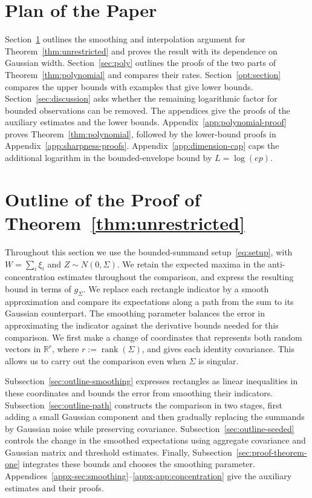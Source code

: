 \documentclass[11pt,letterpaper]{article}
\newenvironment{recovered}{}{}
\newcommand{\vSix}[1]{{\color{magenta}#1}}
\theoremstyle{remark}
\newcommand{\R}{\mathbb R}
\begin{document}
\section*{Plan of the Paper}
Section~\ref{sec:smoothing} outlines the smoothing and interpolation
\vSix{argument for Theorem~\ref{thm:unrestricted} and proves the result
with its dependence on Gaussian width.}
{Section~\ref{sec:poly} outlines the proofs of the two
parts of Theorem~\ref{thm:polynomial} and compares their rates.}
Section~\ref{opt:section} compares the upper bounds with examples that
give lower bounds. Section~\ref{sec:discussion} asks whether the remaining
logarithmic factor for bounded observations can be removed. The appendices
give the proofs of the auxiliary estimates and the lower bounds.
{Appendix~\ref{app:polynomial-proof} proves
Theorem~\ref{thm:polynomial}, followed by the lower-bound proofs in
Appendix~\ref{app:sharpness-proofs}.}
Appendix~\ref{app:dimension-cap} caps the additional logarithm in the
bounded-envelope bound by \(L=\log(ep)\).

\section{Outline of the Proof of Theorem~\ref*{thm:unrestricted}}\label{sec:smoothing}
Throughout this section we use the bounded-summand setup~\eqref{eq:setup},
with \(W=\sum_i\xi_i\) and \(Z\sim N(0,\Sigma)\).
\vSix{We retain the expected maxima in the anti-concentration estimates
throughout the comparison, and express the resulting bound in terms
of \(g_\Sigma\).}
We replace each rectangle indicator by a smooth approximation and compare
its expectations along a path from the sum to its Gaussian counterpart.
The smoothing parameter balances the error in approximating the indicator
against the derivative bounds needed for this comparison.
We first make a change of coordinates that represents both random vectors
in \(\R^r\), where \(r:=\operatorname{rank}(\Sigma)\), and gives each
identity covariance. This allows us to carry out the comparison even
when \(\Sigma\) is singular.

\begin{recovered}
Subsection~\ref{sec:outline-smoothing} expresses rectangles as linear
inequalities in these coordinates and bounds the error from smoothing
their indicators. Subsection~\ref{sec:outline-path} constructs the
comparison in two stages, first adding a small Gaussian component and
then gradually replacing the summands by Gaussian noise while preserving
covariance. Subsection~\ref{sec:outline-seeded} controls the change in
the smoothed expectations using aggregate covariance and Gaussian matrix
and threshold estimates. Finally, Subsection~\ref{sec:proof-theorem-one}
integrates these bounds and chooses the smoothing parameter.
Appendices~\ref{appx-sec:smoothing}--\ref{appx-app:concentration}
give the auxiliary estimates and their proofs.
\end{recovered}
\end{document}
